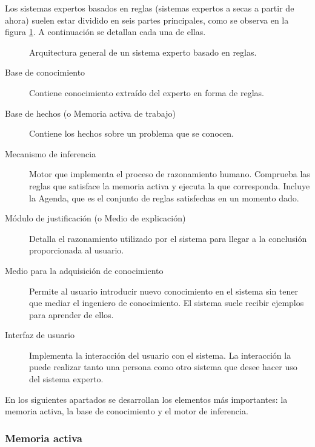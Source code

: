 Los sistemas expertos basados en reglas (sistemas expertos a secas a partir de
ahora) suelen estar dividido en seis partes principales, como se
observa en la figura \ref{fig:arq_sistexp_reg}. A continuación se
detallan cada una de ellas.

\begin{figure}[h]
  \begin{center}
  \end{center}
  \caption{Arquitectura general de un sistema experto basado en reglas.}
  \label{fig:arq_sistexp_reg}
\end{figure}

\begin{description}
    \item[Base de conocimiento] Contiene conocimiento extraído del experto en forma de reglas.
    \item[Base de hechos (o Memoria activa de trabajo)] Contiene los hechos sobre un problema que se conocen.
    \item[Mecanismo de inferencia] Motor que implementa el proceso de
      razonamiento humano. Comprueba las reglas que satisface la
      memoria activa y ejecuta la que corresponda. Incluye la Agenda,
      que es el conjunto de reglas satisfechas en un momento dado.
    \item[Módulo de justificación (o Medio de explicación)] Detalla el razonamiento utilizado por
      el sistema para llegar a la conclusión proporcionada al usuario.
    \item[Medio para la adquisición de conocimiento] Permite al
      usuario introducir nuevo conocimiento en el sistema sin tener
      que mediar el ingeniero de conocimiento. El sistema suele
      recibir ejemplos para aprender de ellos.
    \item[Interfaz de usuario] Implementa la interacción del usuario con
      el sistema. La interacción la puede realizar tanto una persona
      como otro sistema que desee hacer uso del sistema experto.
\end{description}

En los siguientes apartados se desarrollan los elementos más
importantes: la memoria activa, la base de conocimiento y el motor de
inferencia.

\subsubsection{Memoria activa}

